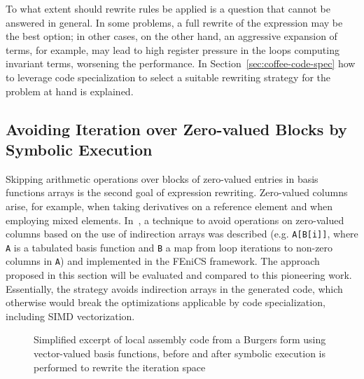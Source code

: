 To what extent should rewrite rules be applied is a question that cannot be answered in general. In some problems, a full rewrite of the expression may be the best option; in other cases, on the other hand, an aggressive expansion of terms, for example, may lead to high register pressure in the loops computing invariant terms, worsening the performance. In Section~\ref{sec:coffee-code-spec} how to leverage code specialization to select a suitable rewriting strategy for the problem at hand is explained.

\subsection{Avoiding Iteration over Zero-valued Blocks by Symbolic Execution}
\label{sec:coffee-avoidzeros}
Skipping arithmetic operations over blocks of zero-valued entries in basis functions arrays is the second goal of expression rewriting. Zero-valued columns arise, for example, when taking derivatives on a reference element and when employing mixed elements. In~\cite{quadrature-olegaard}, a technique to avoid operations on zero-valued columns based on the use of indirection arrays was described (e.g. \texttt{A[B[i]]}, where \texttt{A} is a tabulated basis function and \texttt{B} a map from loop iterations to non-zero columns in \texttt{A}) and implemented in the FEniCS framework. The approach proposed in this section will be evaluated and compared to this pioneering work. Essentially, the strategy avoids indirection arrays in the generated code, which otherwise would break the optimizations applicable by code specialization, including SIMD vectorization. 

\begin{figure}
\tiny
\centering     
{}
\caption{Simplified excerpt of local assembly code from a Burgers form using vector-valued basis functions, before and after symbolic execution is performed to rewrite the iteration space}\label{fig:skip-code}
\end{figure}


